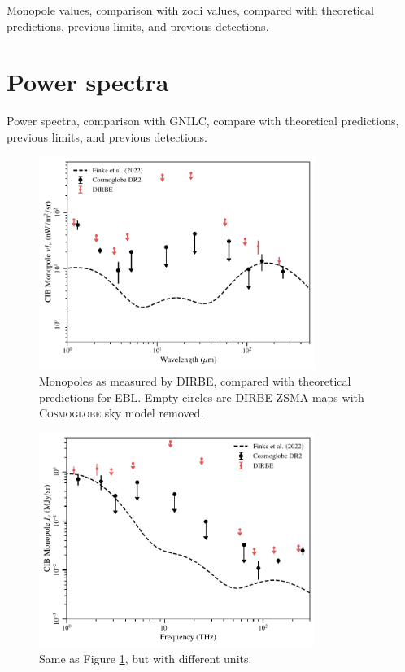 \documentclass{aa}
\begin{document}
Monopole values, comparison with zodi values, compared with theoretical predictions, previous limits, and previous detections.

\section{Power spectra}
\label{sec:fluct}

Power spectra, comparison with GNILC, compare with theoretical predictions, previous limits, and previous detections.



\begin{figure}
	\centering
	\includegraphics[width=0.8\textwidth]{figs/CIB_mono.pdf}
	\caption{Monopoles as measured by DIRBE, compared with theoretical predictions for EBL. Empty circles are DIRBE ZSMA maps with \textsc{Cosmoglobe} sky model removed.}
	\label{fig: EBL_monopoles}
\end{figure}

\begin{figure}
	\centering
	\includegraphics[width=0.8\textwidth]{figs/CIB_THz.pdf}
	\caption{Same as Figure \ref{fig: EBL_monopoles}, but with different units.}
	\label{fig: EBL_monopoles_THz}
\end{figure}
\end{document}
